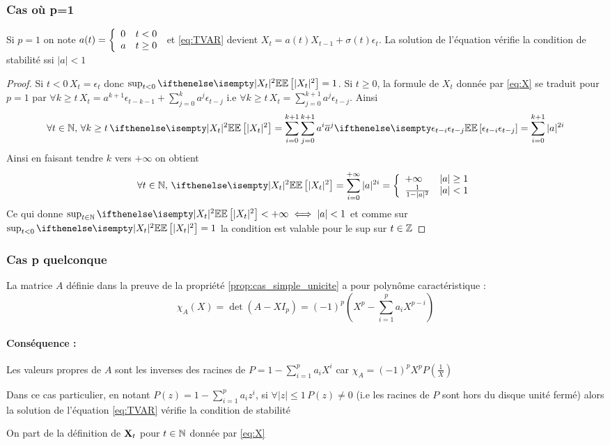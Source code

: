 \documentclass[a4paper,french]{article}
\begin{document}
\subsubsection{Cas où p=1}
\begin{Prop}
Si $p=1$ on note $a(t)= { \left\lbrace \begin{array}{ll} 
0 & t<0 \\
a & t \geq 0 \\ \end{array} \right. } $ et \eqref{eq:TVAR} devient $X_t = a(t)X_{t-1} + \sigma(t) \epsilon_t$. La solution de l'équation vérifie la condition de stabilité ssi $|a| < 1$
\end{Prop}
\begin{proof}
Si $t < 0\, X_t = \epsilon_t$ donc $\sup_{t < 0} \EE[|X_t|^2] = 1$. Si $t\geq 0$, la formule de $X_t$ donnée par \eqref{eq:X} se traduit pour $p=1$ par
$ \forall k \geq t \,  X_t = a^{k+1}\epsilon_{t-k-1} + \sum_{j=0}^k a^j \epsilon_{t-j} $ i.e $\forall k \geq t \, X_t = \sum_{j=0}^{k+1} a^j\epsilon_{t-j}$.
Ainsi 
\[ \forall t \in \nset, \, \forall k \geq t \, \EE[|X_t|^2] = \sum_{i=0}^{k+1} \sum_{j=0}^{k+1} a^i \overline{a}^j \EE[\epsilon_{t-i} \epsilon_{t-j}]= \sum_{i=0}^{k+1} |a|^{2i} \]
Ainsi en faisant tendre $k$ vers $+\infty$ on obtient 
 \[ \forall t \in \nset, \, \EE[|X_t|^2] = \sum_{i=0}^{+\infty} |a|^{2i} = \piecewise{
+\infty & |a|\geq 1 \\
\frac{1}{1-|a|^2} & |a| < 1} \]
Ce qui donne $\sup_{t\in \nset} \EE[|X_t|^2] < +\infty \iff |a| < 1$ et comme sur $\sup_{t < 0} \EE[|X_t|^2] = 1$ la condition est valable pour le sup sur $t\in \mathbb{Z}$
\end{proof}

\subsubsection{Cas p quelconque}
\begin{Lem}
La matrice $A$ définie dans la preuve de la propriété \ref{prop:cas_simple_unicite} a pour polynôme caractéristique : 
\[
\chi_A (X)= \det(A-XI_p) = (-1)^p \left( X^p - \sum_{i=1}^p a_i X^{p-i} \right)
\]
\end{Lem}
\paragraph{Conséquence :}
Les valeurs propres de $A$ sont les inverses des racines de $P = 1- \sum_{i=1}^p a_i X^i$
car $\chi_A = (-1)^p X^p P\left( \frac{1}{X}\right)$
\begin{Prop}
Dans ce cas particulier, en notant $P(z) = 1 - \sum_{i=1}^p a_i z^i$, si $\forall |z| \leq 1\, P(z)\neq 0$ (i.e les racines de $P$ sont hors du disque unité fermé) alors la solution de l'équation \eqref{eq:TVAR} vérifie la condition de stabilité
\end{Prop}
On part de la définition de $\mathbf{X}_t$ pour $t \in \mathbb{N} $ donnée par \eqref{eq:X}
\end{document}
